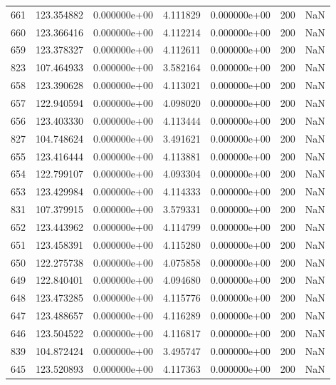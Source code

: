 \begin{tabular}{rrrrrrr}
 661 & 123.354882 &  0.000000e+00 &  4.111829 &  0.000000e+00 &         200 & NaN \\
 660 & 123.366416 &  0.000000e+00 &  4.112214 &  0.000000e+00 &         200 & NaN \\
 659 & 123.378327 &  0.000000e+00 &  4.112611 &  0.000000e+00 &         200 & NaN \\
 823 & 107.464933 &  0.000000e+00 &  3.582164 &  0.000000e+00 &         200 & NaN \\
 658 & 123.390628 &  0.000000e+00 &  4.113021 &  0.000000e+00 &         200 & NaN \\
 657 & 122.940594 &  0.000000e+00 &  4.098020 &  0.000000e+00 &         200 & NaN \\
 656 & 123.403330 &  0.000000e+00 &  4.113444 &  0.000000e+00 &         200 & NaN \\
 827 & 104.748624 &  0.000000e+00 &  3.491621 &  0.000000e+00 &         200 & NaN \\
 655 & 123.416444 &  0.000000e+00 &  4.113881 &  0.000000e+00 &         200 & NaN \\
 654 & 122.799107 &  0.000000e+00 &  4.093304 &  0.000000e+00 &         200 & NaN \\
 653 & 123.429984 &  0.000000e+00 &  4.114333 &  0.000000e+00 &         200 & NaN \\
 831 & 107.379915 &  0.000000e+00 &  3.579331 &  0.000000e+00 &         200 & NaN \\
 652 & 123.443962 &  0.000000e+00 &  4.114799 &  0.000000e+00 &         200 & NaN \\
 651 & 123.458391 &  0.000000e+00 &  4.115280 &  0.000000e+00 &         200 & NaN \\
 650 & 122.275738 &  0.000000e+00 &  4.075858 &  0.000000e+00 &         200 & NaN \\
 649 & 122.840401 &  0.000000e+00 &  4.094680 &  0.000000e+00 &         200 & NaN \\
 648 & 123.473285 &  0.000000e+00 &  4.115776 &  0.000000e+00 &         200 & NaN \\
 647 & 123.488657 &  0.000000e+00 &  4.116289 &  0.000000e+00 &         200 & NaN \\
 646 & 123.504522 &  0.000000e+00 &  4.116817 &  0.000000e+00 &         200 & NaN \\
 839 & 104.872424 &  0.000000e+00 &  3.495747 &  0.000000e+00 &         200 & NaN \\
 645 & 123.520893 &  0.000000e+00 &  4.117363 &  0.000000e+00 &         200 & NaN \\

\end{tabular}
